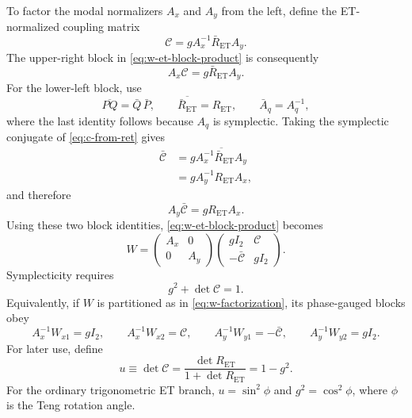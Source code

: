 To factor the modal normalizers $A_x$ and $A_y$ from the left, define the
ET-normalized coupling matrix
\begin{equation}
 \boxed{
 \mathcal C=g A_x^{-1}\bar R_{\mathrm{ET}}A_y.
 }
 \label{eq:c-from-ret}
\end{equation}
The upper-right block in \cref{eq:w-et-block-product} is consequently
\begin{equation}
 A_x\mathcal C=g\bar R_{\mathrm{ET}}A_y.
\end{equation}
For the lower-left block, use
\begin{equation}
 \overline{PQ}=\bar Q\,\bar P,
 \qquad
 \overline{\bar R_{\mathrm{ET}}}=R_{\mathrm{ET}},
 \qquad
 \bar A_q=A_q^{-1},
\end{equation}
where the last identity follows because $A_q$ is symplectic.  Taking the
symplectic conjugate of \cref{eq:c-from-ret} gives
\begin{align}
 \bar{\mathcal C}
 &=g
 \overline{A_x^{-1}\bar R_{\mathrm{ET}}A_y}
 \nonumber\\
 &=g A_y^{-1}R_{\mathrm{ET}}A_x,
\end{align}
and therefore
\begin{equation}
 A_y\bar{\mathcal C}=g R_{\mathrm{ET}}A_x.
\end{equation}
Using these two block identities, \cref{eq:w-et-block-product} becomes
\begin{equation}
 \boxed{
 W=
 \begin{pmatrix}A_x&0\\0&A_y\end{pmatrix}
 \begin{pmatrix}
  g I_2&\mathcal C\\
  -\bar{\mathcal C}&g I_2
 \end{pmatrix}.
 }
 \label{eq:w-factorization}
\end{equation}
Symplecticity requires
\begin{equation}
 g^2+\det\mathcal C=1.
 \label{eq:g-c-condition}
\end{equation}
Equivalently, if $W$ is partitioned as in \cref{eq:w-factorization}, its
phase-gauged blocks obey
\begin{equation}
 \boxed{
 A_x^{-1}W_{x1}=g I_2,\qquad
 A_x^{-1}W_{x2}=\mathcal C,\qquad
 A_y^{-1}W_{y1}=-\bar{\mathcal C},\qquad
 A_y^{-1}W_{y2}=g I_2.
 }
 \label{eq:w-blocks-normalized}
\end{equation}
For later use, define
\begin{equation}
 u\equiv\det\mathcal C
 =\frac{\det R_{\mathrm{ET}}}{1+\det R_{\mathrm{ET}}}
 =1-g^2.
 \label{eq:u-def}
\end{equation}
For the ordinary trigonometric ET branch, $u=\sin^2\phi$ and
$g^2=\cos^2\phi$, where $\phi$ is the Teng rotation angle.

